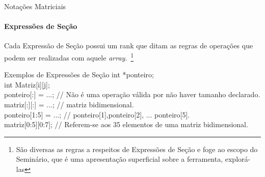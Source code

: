 \documentclass{beamer}
\begin{document}
\begin{frame}[fragile]{Notações Matriciais}
\framesubtitle{Expressões de Seção}
    Cada Expressão de Seção possui um rank que ditam as regras de operações que
    podem ser realizadas com aquele \textit{array}.~\footnote{São diversas as
    regras a respeitos de Expressões de Seção e foge ao escopo do Seminário,
    que é uma apresentação superficial sobre a ferramenta, explorá-las}
\begin{small}
\begin{block}{Exemplos de Expressões de Seção}
    int *ponteiro; \\
    int Matriz[i][j]; \\ \pause
    ponteiro[:] = ...; // Não é uma operação válida por não haver tamanho declarado. \\ \pause
    matriz[:][:] = ...; // matriz bidimensional. \\ \pause
    ponteiro[1:5] = ...; // ponteiro[1],ponteiro[2], ... ponteiro[5]. \\ \pause
    matriz[0:5][0:7]; 	// Referem-se aos 35 elementos de uma matriz bidimensional. \\
\end{block}
\end{small}
\end{frame}
\end{document}
